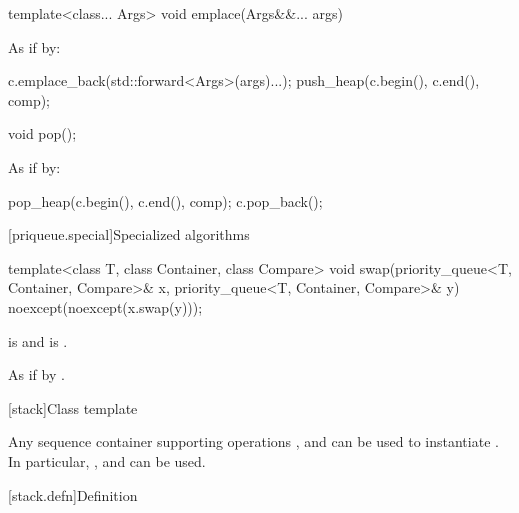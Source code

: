 %
\begin{itemdecl}
template<class... Args> void emplace(Args&&... args)
\end{itemdecl}

\begin{itemdescr}
\pnum
\effects
As if by:
\begin{codeblock}
c.emplace_back(std::forward<Args>(args)...);
push_heap(c.begin(), c.end(), comp);
\end{codeblock}
\end{itemdescr}


%
\begin{itemdecl}
void pop();
\end{itemdecl}

\begin{itemdescr}
\pnum
\effects
As if by:
\begin{codeblock}
pop_heap(c.begin(), c.end(), comp);
c.pop_back();
\end{codeblock}
\end{itemdescr}

[priqueue.special]{Specialized algorithms}

%
\begin{itemdecl}
template<class T, class Container, class Compare>
  void swap(priority_queue<T, Container, Compare>& x,
            priority_queue<T, Container, Compare>& y) noexcept(noexcept(x.swap(y)));
\end{itemdecl}

\begin{itemdescr}
\pnum
\constraints
{} is  and
 is .

\pnum
\effects
As if by .
\end{itemdescr}

[stack]{Class template }

\pnum
{}%
Any sequence container supporting operations
,
and
can be used to instantiate
.
In particular,
,
and
can be used.

[stack.defn]{Definition}

